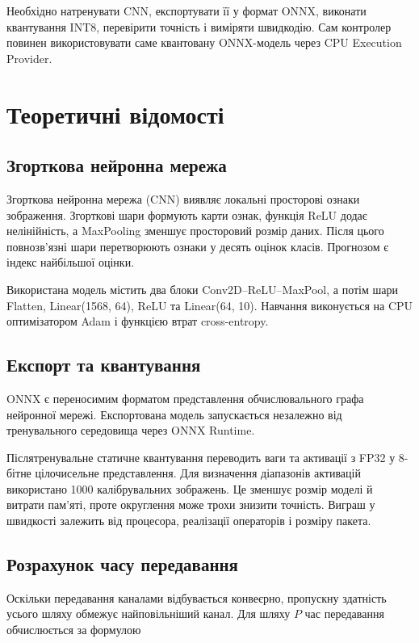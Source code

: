 \documentclass[12pt,a4paper]{article}
\begin{document}
Необхідно натренувати CNN, експортувати її у формат ONNX, виконати квантування
INT8, перевірити точність і виміряти швидкодію. Сам контролер повинен
використовувати саме квантовану ONNX-модель через CPU Execution Provider.

\section{Теоретичні відомості}

\subsection{Згорткова нейронна мережа}

Згорткова нейронна мережа (CNN) виявляє локальні просторові ознаки зображення.
Згорткові шари формують карти ознак, функція ReLU додає нелінійність, а
MaxPooling зменшує просторовий розмір даних. Після цього повнозв'язні шари
перетворюють ознаки у десять оцінок класів. Прогнозом є індекс найбільшої
оцінки.

Використана модель містить два блоки Conv2D--ReLU--MaxPool, а потім шари
Flatten, Linear(1568, 64), ReLU та Linear(64, 10). Навчання виконується на CPU
оптимізатором Adam і функцією втрат cross-entropy.

\subsection{Експорт та квантування}

ONNX є переносимим форматом представлення обчислювального графа нейронної
мережі. Експортована модель запускається незалежно від тренувального
середовища через ONNX Runtime.

Післятренувальне статичне квантування переводить ваги та активації з FP32 у
8-бітне цілочисельне представлення. Для визначення діапазонів активацій
використано 1000 калібрувальних зображень. Це зменшує розмір моделі й витрати
пам'яті, проте округлення може трохи знизити точність. Виграш у швидкості
залежить від процесора, реалізації операторів і розміру пакета.

\subsection{Розрахунок часу передавання}

Оскільки передавання каналами відбувається конвеєрно, пропускну здатність
усього шляху обмежує найповільніший канал. Для шляху $P$ час передавання
обчислюється за формулою
\end{document}
